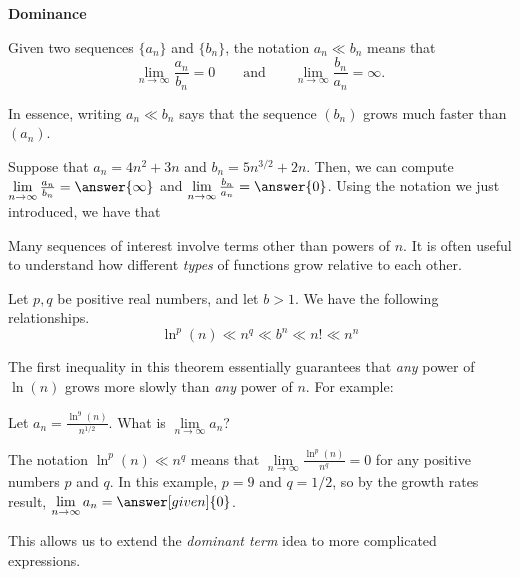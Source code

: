 \documentclass{ximera}
\begin{document}
\begin{definition}  \textbf{\textcolor{green!50!black}{Dominance}} 

  Given two sequences $\{a_n\}$ and $\{b_n\}$, the notation $a_n \ll
  b_n$ means that
  \[
  \lim\limits_{n\to\infty} \frac{a_n}{b_n} =
  0\qquad\text{and}\qquad\lim\limits_{n\to\infty} \frac{b_n}{a_n} =\infty.
  \]
\end{definition}

In essence, writing $a_n \ll b_n$ says that the sequence $(b_n)$ grows
much faster than $(a_n)$.

\begin{example}
Suppose that $a_n = 4n^2+3n$ and $b_n = 5n^{3/2}+2n$.  Then, we can compute $\lim\limits_{n \to \infty} \frac{a_n}{b_n} = \answer{\infty}$ and $\lim\limits_{n \to \infty} \frac{b_n}{a_n} = \answer{0}$.  Using the notation we just introduced, we have that 
\end{example}

Many sequences of interest involve terms other than powers of $n$.  It is often useful to understand how different \emph{types} of functions grow relative to each other.

\begin{theorem}
  Let $p,q$ be positive real numbers, and let $b> 1$. We have the
  following relationships.
  \[
  \ln^p(n)\ll n^q \ll b^n \ll n! \ll n^n
  \]
\end{theorem}



The first inequality in this theorem essentially guarantees that \emph{any} power of $\ln(n)$ grows more slowly than \emph{any} power of $n$.  For example: 

\begin{example}
  Let $a_n  = \frac{\ln^{9}(n)}{n^{1/2}}$.  What is $\lim\limits_{n \to \infty} a_n$?
  
  \begin{explanation}
  The notation  $\ln^p(n)\ll n^q$ means that $\lim\limits_{n \to \infty} \frac{\ln^p(n)}{n^q} = 0$ for any positive numbers $p$ and $q$.  In this example, $p=9$ and $q=1/2$, so by the growth rates result, $\lim\limits_{n\to\infty}a_n =\answer[given]{0}$.  
  
  \end{explanation}
\end{example}

This allows us to extend the \emph{dominant term} idea to more complicated expressions.
\end{document}
